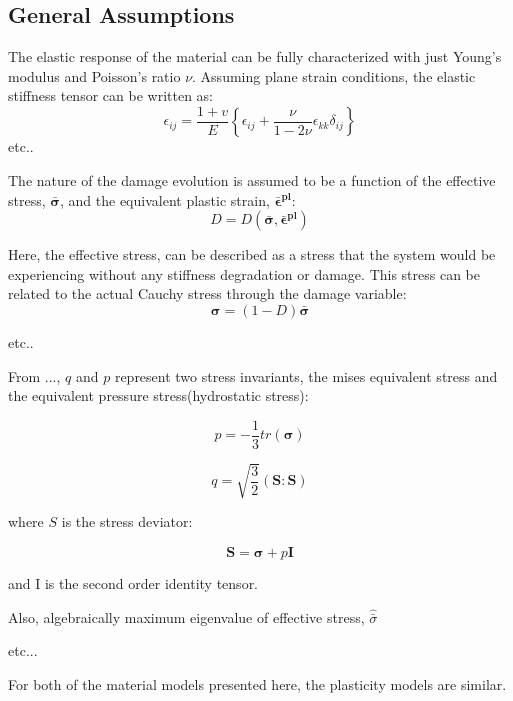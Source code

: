 \subsection{General Assumptions}
The elastic response of the material can be fully characterized with just Young's modulus and Poisson's ratio $\nu$. Assuming plane strain conditions, the elastic stiffness tensor can be written as:
\begin{equation}
\epsilon_{ij}=\frac{1+v}{E}\left\{\epsilon_{ij}+\frac{\nu}{1-2\nu}\epsilon_{kk}\delta_{ij}\right\}
\label{eqn:const8a}
\end{equation}
etc..

The nature of the damage evolution is assumed to be a function of the effective stress, $\boldsymbol{\bar{\sigma}}$, and the equivalent plastic strain, $\boldsymbol{\bar{\epsilon}^{pl}}$:
\begin{equation}
D=D(\boldsymbol{\bar{\sigma}},\boldsymbol{\bar{\epsilon}^{pl}})\label{eqn:const8}
\end{equation}



Here, the effective stress,  can be described as a stress that the system would be experiencing without any stiffness degradation or damage. This stress can be related to the actual Cauchy stress through the damage variable: 
\begin{equation}
\boldsymbol{\sigma}=(1-D)\boldsymbol{\bar{\sigma}}\label{eqn:const7}
\end{equation}

etc..

From ..., $q$ and $p$ represent two stress invariants, the mises
equivalent stress and the equivalent pressure stress(hydrostatic stress):

\begin{equation}
p=-\frac{1}{3}tr\left(\boldsymbol{\sigma}\right)\label{eqn:druc3}
\end{equation}


\begin{equation}
q=\sqrt{\frac{3}{2}}\left(\mathbf{S}:\mathbf{S}\right)\label{eqn:druc4}
\end{equation}


where $S$ is the stress deviator:

\begin{equation}
\mathbf{S}=\boldsymbol{\sigma}+p\mathbf{I}\label{eqn:druc4-1}
\end{equation}


and I is the second order identity tensor. 


Also, algebraically maximum eigenvalue of effective stress, $\hat{\bar{\sigma}}$


etc...

For both of the material models presented here, the plasticity models are similar. 